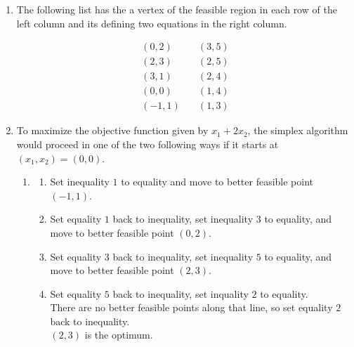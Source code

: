 \documentclass[letterpaper,11pt]{article}
\begin{document}
\begin{enumerate}
\begin{enumerate}
            \item The following list has the a vertex of the feasible region in
                each row of the left column and its defining two equations in
                the right column.

                \begin{align*}
                    (0, 2)  &\quad (3, 5) \\
                    (2, 3)  &\quad (2, 5) \\
                    (3, 1)  &\quad (2, 4) \\
                    (0, 0)  &\quad (1, 4) \\
                    (-1, 1) &\quad (1, 3)
                \end{align*}

            \item To maximize the objective function given by $x_1 + 2x_2$, the
                simplex algorithm would proceed in one of the two following
                ways if it starts at $(x_1, x_2) = (0, 0)$.

                \begin{enumerate}
                    \item
                        \begin{enumerate}
                            \item
                                Set inequality $1$ to equality
                                and move to better feasible point $(-1, 1)$.
                            \item
                                Set equality $1$ back to inequality,
                                set inequality $3$ to equality,
                                and move to better feasible point $(0, 2)$.
                            \item
                                Set equality $3$ back to inequality,
                                set inequality $5$ to equality,
                                and move to better feasible point $(2, 3)$.
                            \item
                                Set equality $5$ back to inequality,
                                set inquality $2$ to equality. \\
                                There are no better feasible points along that
                                line,
                                so set equality $2$ back to inequality. \\
                                $(2, 3)$ is the optimum.
                        \end{enumerate}


\end{enumerate}
\end{enumerate}
\end{enumerate}
\end{document}
